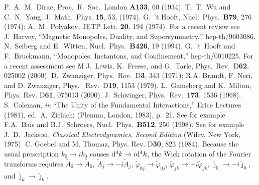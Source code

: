 \documentclass[a4paper,a4paper]{article}
\begin{document}
\begin{thebibliography}{99}
 P.~A.~M.~Dirac, Proc.~R.~Soc.~London {\bf A133}, 60 (1934).
 T.~T.~Wu and C.~N.~Yang, J.~Math.~Phys. {\bf 15}, 53, (1974).
 G.~'t Hooft, Nucl.~Phys.~{\bf B79}, 276 (1974); A.~M.~Polyakov, JETP Lett. {\bf 20}, 194 (1974).
 For a recent review see J.~Harvey, ``Magnetic Monopoles, Duality, and Supersymmetry,'' hep-th/9603086. 
 N.~Seiberg and E.~Witten, Nucl.~Phys.~{\bf B426}, 19 (1994).
 G.~'t~Hooft and F.~Bruckmann, ``Monopoles, Instantons, and Confinement,'' hep-th/0010225.
 For a recent assessment see M.J.~Lewis, K.~Freese, and G.~Tarle, Phys.~Rev.~D{\bf 62}, 025002 (2000).
 D.~Zwanziger, Phys.~Rev.~D{\bf 3}, 343 (1971); R.A. Brandt,
F. Neri, and D. Zwanziger, Phys.~ Rev.~D{\bf 19}, 1153 (1979).
 L.~Gamsberg and K.~Milton, Phys. Rev. D{\bf 61}, 075013 (2000).
 J.~Schwinger, Phys.~Rev.~{\bf 173}, 1536 (1968).
 S.~Coleman, {\it in} ``The Unity of the Fundamental Interactions,''
Erice Lectures (1981), ed.~A.~Zichichi (Plenum, London, 1983), p.~21.
 See for example F.A.~Bais and B.J.~Schroers, Nucl.~Phys.~{\bf B512}, 250 (1998).
 See for example J.~D.~Jackson, {\it Classical Electrodynamics, Second Edition} (Wiley, New York, 1975).
 C. Goebel and M. Thomaz, Phys. Rev. D{\bf 30}, 823 (1984).
 Because the usual prescription $k_0 \rightarrow i k_0$ causes ${\rm d}^4k \rightarrow i {\rm d}^4k$, the Wick rotation of the Fourier transforms requires $\tilde{A}_0 \rightarrow \tilde{A}_0$, $\tilde{A}_j \rightarrow - i \tilde{A}_j$, $\tilde{\varphi}_{0j} \rightarrow \tilde{\varphi}_{0j}$, $\tilde{\varphi}_{jk} \rightarrow -i \tilde{\varphi}_{jk}$, $\tilde{\jmath}_0 \rightarrow -i \tilde{\jmath}_0$,  and $\tilde{\jmath}_k \rightarrow \tilde{\jmath}_k$. 
\end{thebibliography}
\end{document}
